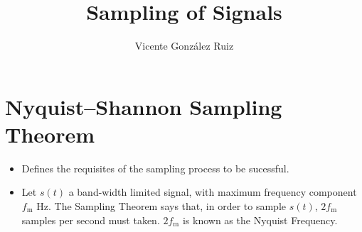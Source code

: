 \title{Sampling of Signals}
\author{Vicente González Ruiz}
\maketitle
\tableofcontents

\section{Nyquist–Shannon Sampling Theorem~\cite{oppenheim2014discrete,lathi1998modern}}
\begin{itemize}
\item Defines the requisites of the sampling process to be sucessful.
\item Let $s(t)$ a band-width limited signal, with maximum frequency
  component $f_{\text{m}}$ Hz. The Sampling Theorem says that, in order
  to sample $s(t)$, $2f_{\text{m}}$ samples per second must taken.
  $2f_{\text{m}}$ is known as the Nyquist Frequency.
\end{itemize}


